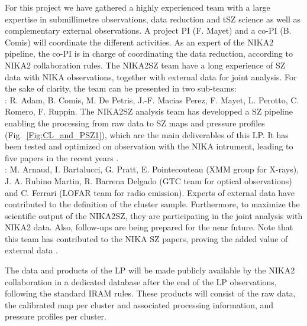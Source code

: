 \documentclass[11pt,a4paper,twoside,graphicx,color]{article}
\begin{document}
 For this project we have
gathered a highly experienced team with a large expertise in
submillimetre observations, data reduction and tSZ science as well as
complementary external observations. A project PI (F. Mayet) and a
co-PI (B. Comis) will coordinate the different activities. As an
expert of the NIKA2 pipeline, the co-PI is in charge of coordinating
the data reduction, according to NIKA2 collaboration rules. The NIKA2SZ
team have a long experience of SZ data with NIKA observations,
together with external data for joint analysis. For the sake of
clarity, the team can be presented in two sub-teams:\\
 : R. Adam, B. Comis,  M. De
Petris, J.-F. Macias Perez, F. Mayet,  L. Perotto, C. Romero,
F. Ruppin. 
The NIKA2SZ analysis team has developped a SZ pipeline enabling the
processing from raw data to SZ maps and pressure profiles (Fig.~\ref{Fig:CL_and_PSZ1}), which are
the main deliverables of this LP. It has been tested and
optimized on observation with the NIKA intrument, leading to five
papers in the recent years
\cite{Adam2014,Adam2015,Adam2016,Adam2016a,Ruppin2016}.\\
  :   M. Arnaud,
I. Bartalucci, G. Pratt, E. Pointecouteau (XMM group for X-rays),
J. A. Rubino Martin, R. Barrena Delgado (GTC team for optical
observations) and C. Ferrari (LOFAR team for radio emission). 
Experts of external data have contributed to the definition of the cluster
sample. Furthermore, to maximize the scientific output of the 
NIKA2SZ, they are participating in the joint analysis
with NIKA2 data. Also, follow-ups are being prepared for the near
future. Note that this team has contributed to the NIKA SZ papers,
proving the added value of external data
\cite{Adam2014,Adam2015,Adam2016,Adam2016a,Ruppin2016}.


  The  
data and products of the LP will be made publicly available by the NIKA2
collaboration in a dedicated database after the end of the LP
observations, following the standard IRAM rules. These products will
consist of the raw data, the calibrated map per cluster and associated
processing information, and pressure profiles per cluster.
\end{document}

